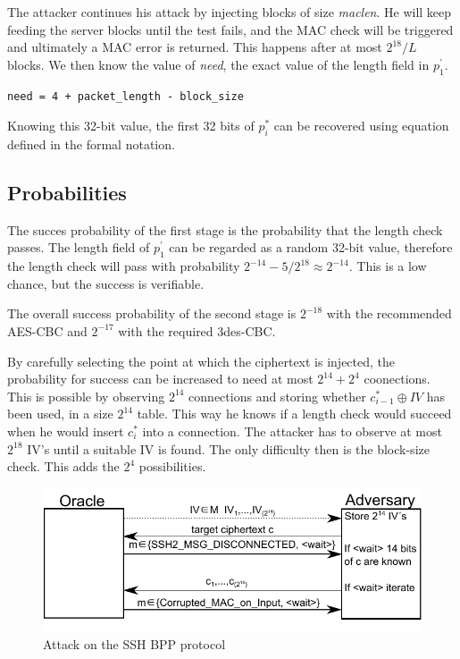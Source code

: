 \documentclass[twocolumn]{article}
\newcommand{\xor}{\oplus}
\begin{document}
\indent The attacker continues his attack by injecting blocks of size \emph{maclen}. He will keep feeding the server blocks until the test fails, and the MAC check will be triggered and ultimately a MAC error is returned. This happens after at most $2^{18}/L$ blocks. We then know the value of \emph{need}, the exact value of the length field in $p_1^{'}$.
\begin{verbatim}
need = 4 + packet_length - block_size
\end{verbatim}
\indent Knowing this 32-bit value, the first 32 bits of $p^*_i$ can be recovered using equation defined in the formal notation.

\subsection*{Probabilities}

\indent The succes probability of the first stage is the probability that the length check passes.
The length field of $p^{'}_1$ can be regarded as a random 32-bit value, therefore the length check will pass with probability $2^{-14} - 5/2^{18} \approx 2^{-14}$. This is a low chance, but the success is verifiable.

\indent The overall success probability of the second stage is $2^{-18}$ with the recommended AES-CBC and $2^{-17}$ with the required 3des-CBC.

\indent By carefully selecting the point at which the ciphertext is injected, the probability for success can be increased to need at most $2^{14}+2^{4}$ coonections. This is possible by observing $2^14$ connections and storing whether $c^*_{i-1} \xor IV$ has been used, in a size $2^{14}$ table. This way he knows if a length check would succeed when he would insert $c_i^*$ into a connection. The attacker has to observe at most $2^{18}$ IV's until a suitable IV is found. The only difficulty then is the block-size check. This adds the $2^{4}$ possibilities.

\begin{figure}
	  \centering
    	\includegraphics[scale=1]{drawing.pdf}
	\caption{Attack on the SSH BPP protocol~\cite{Albrecht2009}}
	\label{fig:BPPAttack}
\end{figure}
\end{document}
